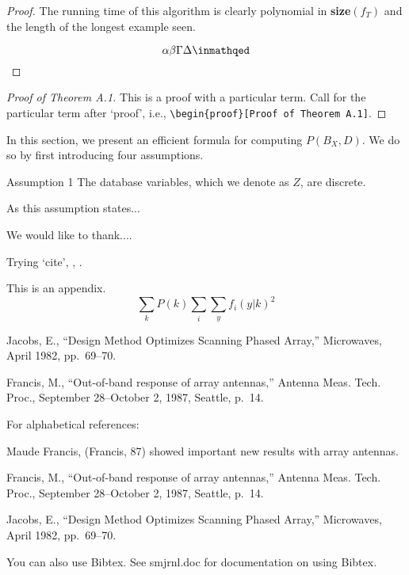 \begin{article}
\begin{proof}
The running time of this algorithm is clearly polynomial in 
{\bf size}$(f_T)$ and the length of the longest example seen.

\[
\alpha\beta\Gamma\Delta\inmathqed
\]
\end{proof}

\begin{proof}[Proof of Theorem A.1]
This is a proof with a particular term. Call for the
particular term after `proof', i.e., 
\verb+\begin{proof}[Proof of Theorem A.1]+.
\end{proof}


In this section, we present an efficient formula for computing $P(B_X, D)$.
We do so by first introducing four assumptions.

\begin{demo}{Assumption 1}
The database variables, which we denote as $Z$, are discrete.
\end{demo}

As this assumption states...



\acknowledgements
We would like to thank....

Trying `cite', \cite{jacobs}, \cite{francis}.

\appendix
This is an appendix.
\begin{equation}
\sum_k P(k) \sum_i \sum_y f_i(y|k)^2
\end{equation}


\begin{references}
Jacobs, E., ``Design Method Optimizes Scanning
 Phased Array,'' Microwaves, April 1982, pp.\ 69--70.

 Francis, M., ``Out-of-band response of array 
 antennas,'' Antenna Meas.  Tech. Proc., September 28--October 2,
1987, Seattle, p.~14.
\end{references}

For alphabetical references:

Maude Francis, (Francis, 87) showed important new results
with array antennas.

\begin{alphareferences}
Francis, M., ``Out-of-band response of array 
antennas,'' Antenna Meas.  Tech. Proc., September 28--October 2,
1987, Seattle, p.~14.

Jacobs, E., ``Design Method Optimizes Scanning
Phased Array,'' Microwaves, April 1982, pp.\ 69--70.
\end{alphareferences}

\vskip12pt
You can also use Bibtex. See smjrnl.doc for documentation on 
using Bibtex.

\end{article}

